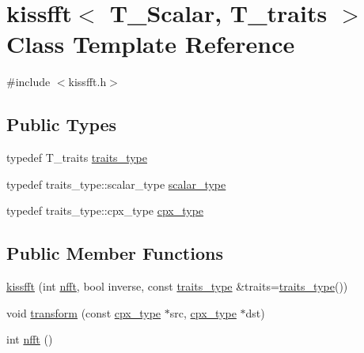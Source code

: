 \hypertarget{classkissfft}{}\section{kissfft$<$ T\+\_\+\+Scalar, T\+\_\+traits $>$ Class Template Reference}
\label{classkissfft}


{\ttfamily \#include $<$kissfft.\+h$>$}

\subsection*{Public Types}
\begin{DoxyCompactItemize}
\item 
typedef T\+\_\+traits \hyperlink{classkissfft_aa5a17184447b2a77c41e61f2d491bad5}{traits\+\_\+type}
\item 
typedef traits\+\_\+type\+::scalar\+\_\+type \hyperlink{classkissfft_a074a5f74883901c625b6e80660d16ad4}{scalar\+\_\+type}
\item 
typedef traits\+\_\+type\+::cpx\+\_\+type \hyperlink{classkissfft_af66664488b0b1b2995f3e4c2f63a8b7d}{cpx\+\_\+type}
\end{DoxyCompactItemize}
\subsection*{Public Member Functions}
\begin{DoxyCompactItemize}
\item 
\hyperlink{classkissfft_a9140ed2cbfe6116eba53256e16084475}{kissfft} (int \hyperlink{classkissfft_a387da366ef44c52769e5052e327009dc}{nfft}, bool inverse, const \hyperlink{classkissfft_aa5a17184447b2a77c41e61f2d491bad5}{traits\+\_\+type} \&traits=\hyperlink{classkissfft_aa5a17184447b2a77c41e61f2d491bad5}{traits\+\_\+type}())
\item 
void \hyperlink{classkissfft_ad2db80b9c9b087fb36fbe8b3b0078df8}{transform} (const \hyperlink{classkissfft_af66664488b0b1b2995f3e4c2f63a8b7d}{cpx\+\_\+type} $\ast$src, \hyperlink{classkissfft_af66664488b0b1b2995f3e4c2f63a8b7d}{cpx\+\_\+type} $\ast$dst)
\item 
int \hyperlink{classkissfft_a387da366ef44c52769e5052e327009dc}{nfft} ()
\end{DoxyCompactItemize}

